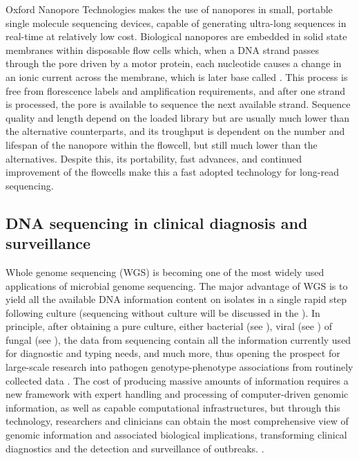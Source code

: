Oxford Nanopore Technologies makes the use of nanopores in small, portable single molecule sequencing devices, capable of generating ultra-long sequences in real-time at relatively low cost. Biological nanopores are embedded in solid state membranes within disposable flow cells which, when a DNA strand passes through the pore driven by a motor protein, each nucleotide causes a change in an ionic current across the membrane, which is later base called \citep{hoang_long-reads-based_2022, loman_twenty_2015}. This process is free from florescence labels and amplification requirements, and after one strand is processed, the pore is available to sequence the next available strand. Sequence quality and length depend on the loaded library but are usually much lower than the alternative counterparts, and its troughput is dependent on the number and lifespan of the nanopore within the flowcell, but still much lower than the alternatives. Despite this, its portability, fast advances, and continued improvement of the flowcells make this a fast adopted technology for long-read sequencing.  

\subsection{DNA sequencing in clinical diagnosis and surveillance} \label{ssec:sequencing_diagnosis}

Whole genome sequencing (WGS) is becoming one of the most widely used applications of microbial genome sequencing. The major advantage of WGS is to yield all the available DNA information content on isolates in a single rapid step following culture (sequencing without culture will be discussed in the ). In principle, after obtaining a pure culture, either bacterial (see ), viral (see ) of fungal (see ), the data from sequencing contain all the information currently used for diagnostic and typing needs, and much more, thus opening the prospect for large-scale research into pathogen genotype-phenotype associations from routinely collected data \citep{didelot_transforming_2012}.
The cost of producing massive amounts of information requires a new framework with expert handling and processing of computer-driven genomic information, as well as capable computational infrastructures, but through this technology, researchers and clinicians can obtain the most comprehensive view of genomic information and associated biological implications, transforming clinical diagnostics and the detection and surveillance of outbreaks. \citep{cirulli_uncovering_2010, noauthor_genomic_2019, goodwin_coming_2016}.

